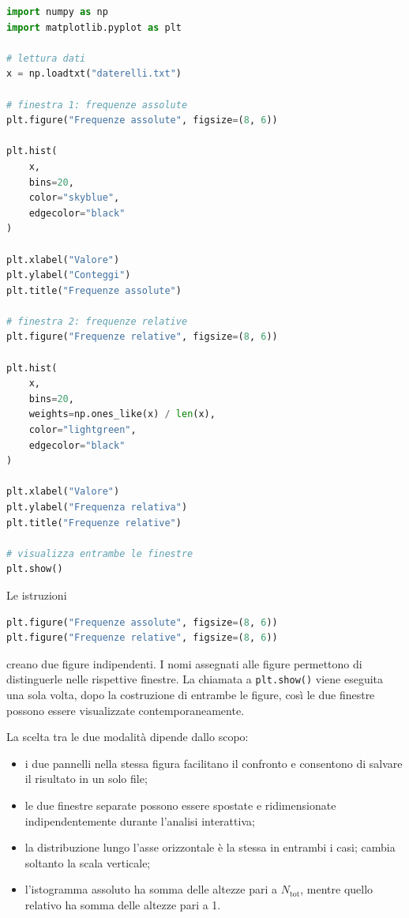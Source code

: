 \documentclass[11pt,a4paper]{book}
\begin{document}
\begin{lstlisting}[language=Python]
import numpy as np
import matplotlib.pyplot as plt

# lettura dati
x = np.loadtxt("daterelli.txt")

# finestra 1: frequenze assolute
plt.figure("Frequenze assolute", figsize=(8, 6))

plt.hist(
    x,
    bins=20,
    color="skyblue",
    edgecolor="black"
)

plt.xlabel("Valore")
plt.ylabel("Conteggi")
plt.title("Frequenze assolute")

# finestra 2: frequenze relative
plt.figure("Frequenze relative", figsize=(8, 6))

plt.hist(
    x,
    bins=20,
    weights=np.ones_like(x) / len(x),
    color="lightgreen",
    edgecolor="black"
)

plt.xlabel("Valore")
plt.ylabel("Frequenza relativa")
plt.title("Frequenze relative")

# visualizza entrambe le finestre
plt.show()
\end{lstlisting}

Le istruzioni

\begin{lstlisting}[language=Python]
plt.figure("Frequenze assolute", figsize=(8, 6))
plt.figure("Frequenze relative", figsize=(8, 6))
\end{lstlisting}

creano due figure indipendenti. I nomi assegnati alle figure permettono
di distinguerle nelle rispettive finestre. La chiamata a
\texttt{plt.show()} viene eseguita una sola volta, dopo la costruzione di
entrambe le figure, così le due finestre possono essere visualizzate
contemporaneamente.

La scelta tra le due modalità dipende dallo scopo:

\begin{itemize}
    \item i due pannelli nella stessa figura facilitano il confronto e
          consentono di salvare il risultato in un solo file;
    \item le due finestre separate possono essere spostate e
          ridimensionate indipendentemente durante l'analisi interattiva;
    \item la distribuzione lungo l'asse orizzontale è la stessa in
          entrambi i casi; cambia soltanto la scala verticale;
    \item l'istogramma assoluto ha somma delle altezze pari a
          $N_{\mathrm{tot}}$, mentre quello relativo ha somma delle
          altezze pari a 1.
\end{itemize}
\end{document}
